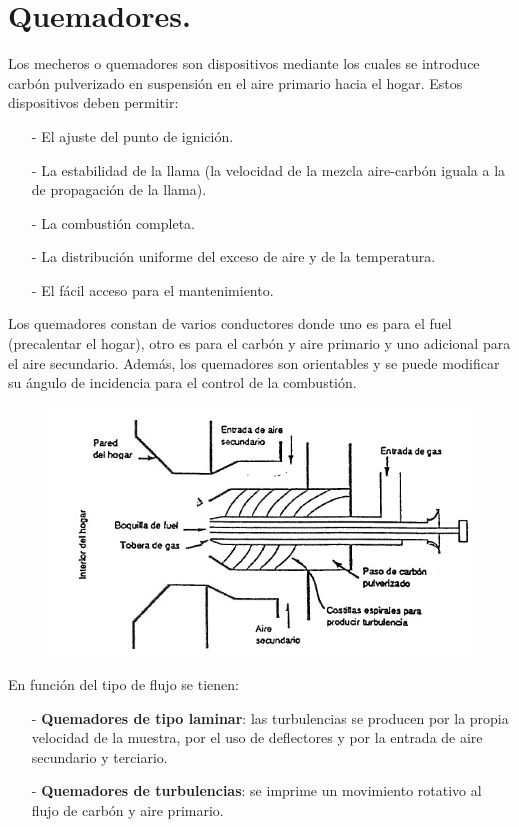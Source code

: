 \section{Quemadores.}
Los mecheros o quemadores son dispositivos mediante los cuales se introduce carbón pulverizado en suspensión en el aire primario hacia el hogar. Estos dispositivos deben permitir:
\begin{itemize}
	\item [-] El ajuste del punto de ignición.
	\item [-] La estabilidad de la llama (la velocidad de la mezcla aire-carbón iguala a la de propagación de la llama).
	\item [-] La combustión completa.
 	\item [-] La distribución uniforme del exceso de aire y de la temperatura.
	\item [-] El fácil acceso para el mantenimiento.
\end{itemize}



Los quemadores constan de varios conductores donde uno es para el fuel (precalentar el hogar), otro es para el carbón y aire primario y uno adicional para el aire secundario. Además, los quemadores son orientables y se puede modificar su ángulo de incidencia para el control de la combustión.
\begin{figure}[H]
	\centering
	\includegraphics[width=0.6\linewidth]{res/tema10/boquilla}
	\label{fig:boquilla}
\end{figure}


En función del tipo de flujo se tienen:
\begin{itemize}
	\item [-] \textbf{Quemadores de tipo laminar}: las turbulencias se producen por la propia velocidad de la muestra, por el uso de deflectores y por la entrada de aire secundario y terciario.
	\item [-] \textbf{Quemadores de turbulencias}: se imprime un movimiento rotativo al flujo de carbón y aire primario.
\end{itemize}


